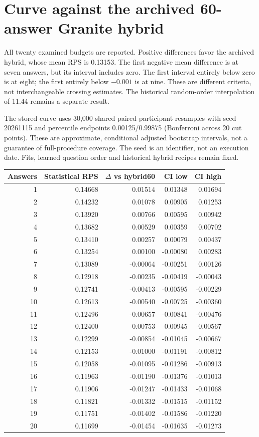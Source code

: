\documentclass[10pt]{article}
\begin{document}
\section{Curve against the archived 60-answer Granite hybrid}
All twenty examined budgets are reported. Positive differences favor the archived
hybrid, whose mean RPS is 0.13153. The first negative
mean difference is at seven answers, but its interval includes zero. The first
interval entirely below zero is at eight; the first entirely below $-0.001$ is
at nine. These are different criteria, not interchangeable crossing estimates.
The historical random-order interpolation of 11.44 remains a separate result.

The stored curve uses 30,000 shared paired participant resamples with seed 20261115
and percentile endpoints 0.00125/0.99875 (Bonferroni across 20 cut points).
These are approximate, conditional adjusted bootstrap intervals, not a guarantee
of full-procedure coverage. The seed is an identifier, not an execution date.
Fits, learned question order and historical hybrid recipes remain fixed.
\begin{longtable}{rrrrr}\toprule Answers & Statistical RPS & $\Delta$ vs hybrid60 & CI low & CI high\\\midrule\endhead
1 & 0.14668 & 0.01514 & 0.01348 & 0.01694\\
2 & 0.14232 & 0.01078 & 0.00905 & 0.01253\\
3 & 0.13920 & 0.00766 & 0.00595 & 0.00942\\
4 & 0.13682 & 0.00529 & 0.00359 & 0.00702\\
5 & 0.13410 & 0.00257 & 0.00079 & 0.00437\\
6 & 0.13254 & 0.00100 & -0.00080 & 0.00283\\
7 & 0.13089 & -0.00064 & -0.00251 & 0.00126\\
8 & 0.12918 & -0.00235 & -0.00419 & -0.00043\\
9 & 0.12741 & -0.00413 & -0.00595 & -0.00229\\
10 & 0.12613 & -0.00540 & -0.00725 & -0.00360\\
11 & 0.12496 & -0.00657 & -0.00841 & -0.00476\\
12 & 0.12400 & -0.00753 & -0.00945 & -0.00567\\
13 & 0.12299 & -0.00854 & -0.01045 & -0.00667\\
14 & 0.12153 & -0.01000 & -0.01191 & -0.00812\\
15 & 0.12058 & -0.01095 & -0.01286 & -0.00913\\
16 & 0.11963 & -0.01190 & -0.01376 & -0.01013\\
17 & 0.11906 & -0.01247 & -0.01433 & -0.01068\\
18 & 0.11821 & -0.01332 & -0.01515 & -0.01152\\
19 & 0.11751 & -0.01402 & -0.01586 & -0.01220\\
20 & 0.11699 & -0.01454 & -0.01635 & -0.01273\\
\bottomrule\end{longtable}
\end{document}

